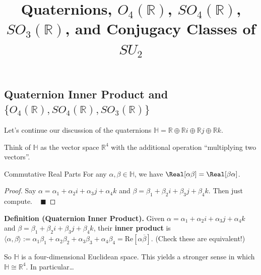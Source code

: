 \title{Quaternions, $O_4(\mathbb{R})$, $SO_4(\mathbb{R})$, $SO_3(\mathbb{R})$, and Conjugacy Classes of $SU_2$}



\subsection{Quaternion Inner Product and $\{O_4(\mathbb{R}), SO_4(\mathbb{R}), SO_3(\mathbb{R})\}$}

Let's continue our discussion of the quaternions $\mathbb{H} = \mathbb{R} \oplus \mathbb{R}i \oplus \mathbb{R}j \oplus \mathbb{R}k$.

\begin{remark}
    Think of $\mathbb{H}$ as the vector space $\mathbb{R}^4$ with the additional operation ``multiplying two vectors''.
\end{remark}

\begin{theorem}{Commutative Real Parts}
    For any $\alpha, \beta \in \mathbb{H}$, we have $\Real[\alpha\beta] = \Real[\beta\alpha]$.
\end{theorem}

\begin{proof}
    Say $\alpha = \alpha_1 + \alpha_2i + \alpha_3j + \alpha_4k$ and $\beta = \beta_1 + \beta_2i + \beta_3j + \beta_4k$.  Then just compute. ~ $\blacksquare$
\end{proof}

\textbf{Definition (Quaternion Inner Product).} Given $\alpha = \alpha_1 + \alpha_2i + \alpha_3j + \alpha_4k$ and $\beta = \beta_1 + \beta_2i + \beta_3j + \beta_4k$, their \textbf{inner product} is $\langle \alpha, \beta \rangle := \alpha_1\beta_1 + \alpha_2\beta_2 + \alpha_3\beta_3 + \alpha_4\beta_4 = \mathrm{Re}[\alpha \overline{\beta}]$.  (Check these are equivalent!)

So $\mathbb{H}$ is a four-dimensional Euclidean space.  This yields a stronger sense in which $\mathbb{H} \cong \mathbb{R}^4$.  In particular\dots


